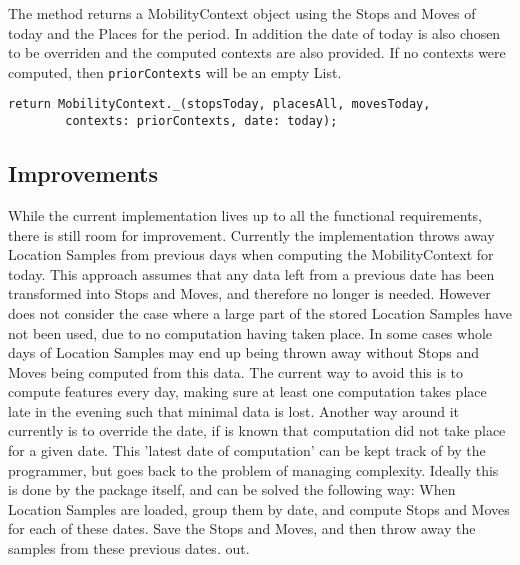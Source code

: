 The method returns a MobilityContext object using the Stops and Moves of today and the Places for the period. In addition the date of today is also chosen to be overriden and the computed contexts are also provided. If no contexts were computed, then \verb|priorContexts| will be an empty List.

\begin{verbatim}
return MobilityContext._(stopsToday, placesAll, movesToday,
        contexts: priorContexts, date: today);
\end{verbatim}

\subsection{Improvements}
While the current implementation lives up to all the functional requirements, there is still room for improvement. Currently the implementation throws away Location Samples from previous days when computing the MobilityContext for today. This approach assumes that any data left from a previous date has been transformed into Stops and Moves, and therefore no longer is needed. However does not consider the case where a large part of the stored Location Samples have not been used, due to no computation having taken place. In some cases whole days of Location Samples may end up being thrown away without Stops and Moves being computed from this data. The current way to avoid this is to compute features every day, making sure at least one computation takes place late in the evening such that minimal data is lost. Another way around it currently is to override the date, if is known that computation did not take place for a given date. This 'latest date of computation' can be kept track of by the programmer, but goes back to the problem of managing complexity. Ideally this is done by the package itself, and can be solved the following way:
When Location Samples are loaded, group them by date, and compute Stops and Moves for each of these dates. Save the Stops and Moves, and then throw away the samples from these previous dates. out.
